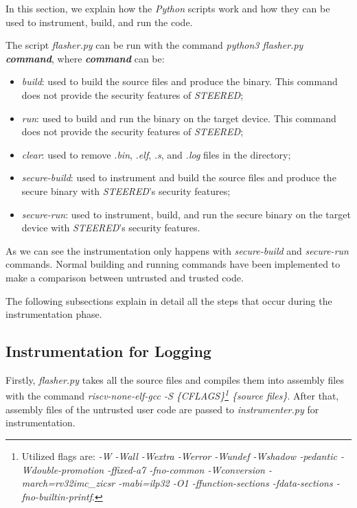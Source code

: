 In this section, we explain how the \textit{Python} scripts work and how they
can be used to instrument, build, and run the code.

The script \textit{flasher.py} can be run with the command \textit{python3
flasher.py \textbf{command}}, where \textit{\textbf{command}} can be:
\begin{itemize}[noitemsep]
  \item \textit{build}: used to build the source files and produce the binary.
    This command does not provide the security features of \textit{STEERED};

  \item \textit{run}: used to build and run the binary on the target device.
    This command does not provide the security features of \textit{STEERED};

  \item \textit{clear}: used to remove \textit{.bin}, \textit{.elf}, \textit{.s},
    and \textit{.log} files in the directory;

  \item \textit{secure-build}: used to instrument and build the source files and
    produce the secure binary with \textit{STEERED}'s security features;

  \item \textit{secure-run}: used to instrument, build, and run the secure binary
    on the target device with \textit{STEERED}'s security features.
\end{itemize}

As we can see the instrumentation only happens with \textit{secure-build} and \textit{secure-run}
commands. Normal building and running commands have been implemented to make a comparison
between untrusted and trusted code.

The following subsections explain in detail all the steps that occur during the instrumentation
phase.

\subsection{Instrumentation for Logging}
\label{subsec:logging}

Firstly, \textit{flasher.py} takes all the source files and compiles them into
assembly files with the command \textit{riscv-none-elf-gcc -S \{CFLAGS\}\footnote{Utilized
flags are: \textit{-W -Wall -Wextra -Werror -Wundef -Wshadow -pedantic -Wdouble-promotion
-ffixed-a7 -fno-common -Wconversion -march=rv32imc\_zicsr -mabi=ilp32 -O1 -ffunction-sections
-fdata-sections -fno-builtin-printf}.} \{source files\}}. After that, assembly files
of the untrusted user code are passed to \textit{instrumenter.py} for
instrumentation.

